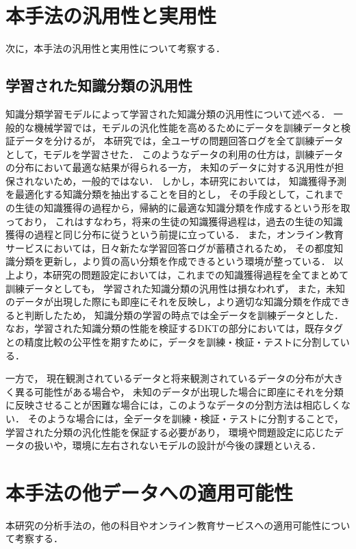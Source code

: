 \section{本手法の汎用性と実用性}
次に，本手法の汎用性と実用性について考察する．

\subsection{学習された知識分類の汎用性}
知識分類学習モデルによって学習された知識分類の汎用性について述べる．
一般的な機械学習では，モデルの汎化性能を高めるためにデータを訓練データと検証データを分けるが，
本研究では，全ユーザの問題回答ログを全て訓練データとして，モデルを学習させた．
このようなデータの利用の仕方は，訓練データの分布において最適な結果が得られる一方，
未知のデータに対する汎用性が担保されないため，一般的ではない．
しかし，本研究においては，
知識獲得予測を最適化する知識分類を抽出することを目的とし，
その手段として，これまでの生徒の知識獲得の過程から，帰納的に最適な知識分類を作成するという形を取っており，
これはすなわち，将来の生徒の知識獲得過程は，過去の生徒の知識獲得の過程と同じ分布に従うという前提に立っている．
また，オンライン教育サービスにおいては，日々新たな学習回答ログが蓄積されるため，
その都度知識分類を更新し，より質の高い分類を作成できるという環境が整っている．
以上より，本研究の問題設定においては，これまでの知識獲得過程を全てまとめて訓練データとしても，
学習された知識分類の汎用性は損なわれず，
また，未知のデータが出現した際にも即座にそれを反映し，より適切な知識分類を作成できると判断したため，
知識分類の学習の時点では全データを訓練データとした．
なお，学習された知識分類の性能を検証するDKTの部分においては，既存タグとの精度比較の公平性を期すために，データを訓練・検証・テストに分割している．

一方で，
現在観測されているデータと将来観測されているデータの分布が大きく異る可能性がある場合や，
未知のデータが出現した場合に即座にそれを分類に反映させることが困難な場合には，このようなデータの分割方法は相応しくない．
そのような場合には，全データを訓練・検証・テストに分割することで，
学習された分類の汎化性能を保証する必要があり，
環境や問題設定に応じたデータの扱いや，環境に左右されないモデルの設計が今後の課題といえる．


\section{本手法の他データへの適用可能性}
本研究の分析手法の，他の科目やオンライン教育サービスへの適用可能性について考察する．

